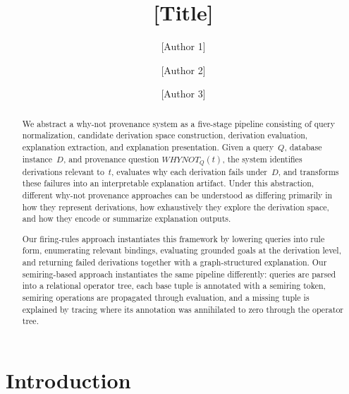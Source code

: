\documentclass{llncs}
\begin{document}
\title{[Title]}

\author{
  [Author 1] \and
  [Author 2] \and
  [Author 3]
}

\institute{
  [Institution 1], [Address 1] \\
  \email{[email1]}
  \and
  [Institution 2], [Address 2] \\
  \email{[email2]}
  \and
  [Institution 3], [Address 3] \\
  \email{[email3]}
}

\maketitle

\begin{abstract}
We abstract a why-not provenance system as a five-stage pipeline
consisting of query normalization, candidate derivation space
construction, derivation evaluation, explanation extraction, and
explanation presentation. Given a query~$Q$, database instance~$D$,
and provenance question $\mathit{WHYNOT}_Q(t)$, the system identifies
derivations relevant to~$t$, evaluates why each derivation fails
under~$D$, and transforms these failures into an interpretable
explanation artifact. Under this abstraction, different why-not
provenance approaches can be understood as differing primarily in how
they represent derivations, how exhaustively they explore the
derivation space, and how they encode or summarize explanation outputs.

Our firing-rules approach instantiates this framework by lowering
queries into rule form, enumerating relevant bindings, evaluating
grounded goals at the derivation level, and returning failed
derivations together with a graph-structured explanation. Our
semiring-based approach instantiates the same pipeline differently:
queries are parsed into a relational operator tree, each base tuple
is annotated with a semiring token, semiring operations are propagated
through evaluation, and a missing tuple is explained by tracing where
its annotation was annihilated to zero through the operator tree.

\end{abstract}

\section{Introduction}
\label{sec:intro}
\end{document}
